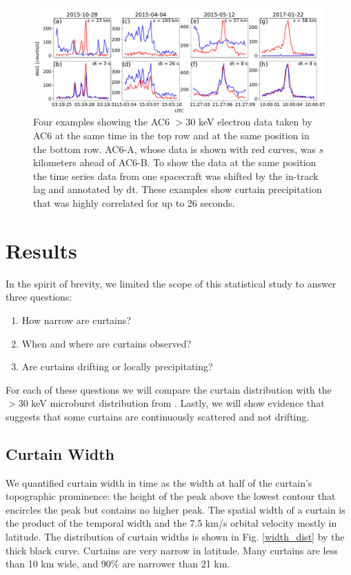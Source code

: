 \documentclass[draft]{agujournal2019}
\begin{document}
\begin{figure}
\includegraphics[width=\textwidth]{fig1.pdf}
\caption{Four examples showing the AC6 $> 30$ keV electron data taken by AC6 at the same time in the top row and at the same position in the bottom row. AC6-A, whose data is shown with red curves, was $s$ kilometers ahead of AC6-B. To show the data at the same position the time series data from one spacecraft was shifted by the in-track lag and annotated by dt. These examples show curtain precipitation that was highly correlated for up to 26 seconds.}
\label{fig1}
\end{figure}

\section{Results} \label{results}
In the spirit of brevity, we limited the scope of this statistical study to answer three questions:

\begin{enumerate}
\item How narrow are curtains?
\item When and where are curtains observed?
\item Are curtains drifting or locally precipitating?
\end{enumerate} For each of these questions we will compare the curtain distribution with the $>30$ keV microburst distribution from . Lastly, we will show evidence that suggests that some curtains are continuously scattered and not drifting.

\subsection{Curtain Width}
We quantified curtain width in time as the width at half of the curtain's topographic prominence: the height of the peak above the lowest contour that encircles the peak but contains no higher peak. The spatial width of a curtain is the product of the temporal width and the 7.5 km/s orbital velocity mostly in latitude. The distribution of curtain widths is shown in Fig. \ref{width_dist} by the thick black curve. Curtains are very narrow in latitude. Many curtains are less than 10 km wide, and 90\% are narrower than 21 km.
	
\end{document}
